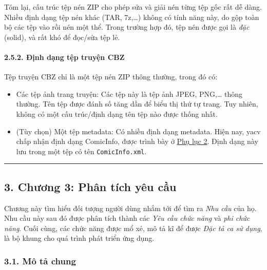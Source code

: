 \documentclass[
]{article}
\begin{document}
Tóm lại, cấu trúc tệp nén ZIP cho phép sửa và giải nén từng tệp gốc rất
dễ dàng. Nhiều định dạng tệp nén khác (TAR, 7z,\ldots) không có tính
năng này, do gộp toàn bộ các tệp vào rồi nén một thể. Trong trường hợp
đó, tệp nén được gọi là \emph{đặc} (solid), và rất khó để đọc/sửa tệp
lẻ.

\hypertarget{ux111ux1ecbnh-dux1ea1ng-tux1ec7p-truyux1ec7n-cbz}{%
\paragraph{\texorpdfstring{2.5.2. Định dạng tệp truyện CBZ
}{2.5.2. Định dạng tệp truyện CBZ }}\label{ux111ux1ecbnh-dux1ea1ng-tux1ec7p-truyux1ec7n-cbz}}

Tệp truyện CBZ chỉ là một tệp nén ZIP thông thường, trong đó có:

\begin{itemize}
\item
  Các tệp ảnh trang truyện: Các tệp này là tệp ảnh JPEG, PNG,\ldots{}
  thông thường. Tên tệp được đánh số tăng dần để biểu thị thứ tự trang.
  Tuy nhiên, không có một cấu trúc/định dạng tên tệp nào được thống
  nhất.
\item
  (Tùy chọn) Một tệp metadata: Có nhiều định dạng metadata. Hiện nay,
  yacv chấp nhận định dạng ComicInfo, được trình bày ở
  \protect\hyperlink{P8.2-comicinfo.xsd}{Phụ lục 2}. Định dạng này lưu
  trong một tệp có tên \texttt{ComicInfo.xml}.
\end{itemize}

\begin{center}\rule{0.5\linewidth}{0.5pt}\end{center}

\hypertarget{chux1b0ux1a1ng-3-phuxe2n-tuxedch-yuxeau-cux1ea7u}{%
\subsection{\texorpdfstring{3. Chương 3: Phân tích yêu cầu
}{3. Chương 3: Phân tích yêu cầu }}\label{chux1b0ux1a1ng-3-phuxe2n-tuxedch-yuxeau-cux1ea7u}}

Chương này tìm hiểu đối tượng người dùng nhắm tới để tìm ra \emph{Nhu
cầu} của họ. Nhu cầu này sau đó được phân tích thành các \emph{Yêu cầu
chức năng} và \emph{phi chức năng}. Cuối cùng, các chức năng được mổ xẻ,
mô tả kĩ để được \emph{Đặc tả ca sử dụng}, là bộ khung cho quá trình
phát triển ứng dụng.

\hypertarget{muxf4-tux1ea3-chung}{%
\subsubsection{\texorpdfstring{3.1. Mô tả chung
}{3.1. Mô tả chung }}\label{muxf4-tux1ea3-chung}}
\end{document}
